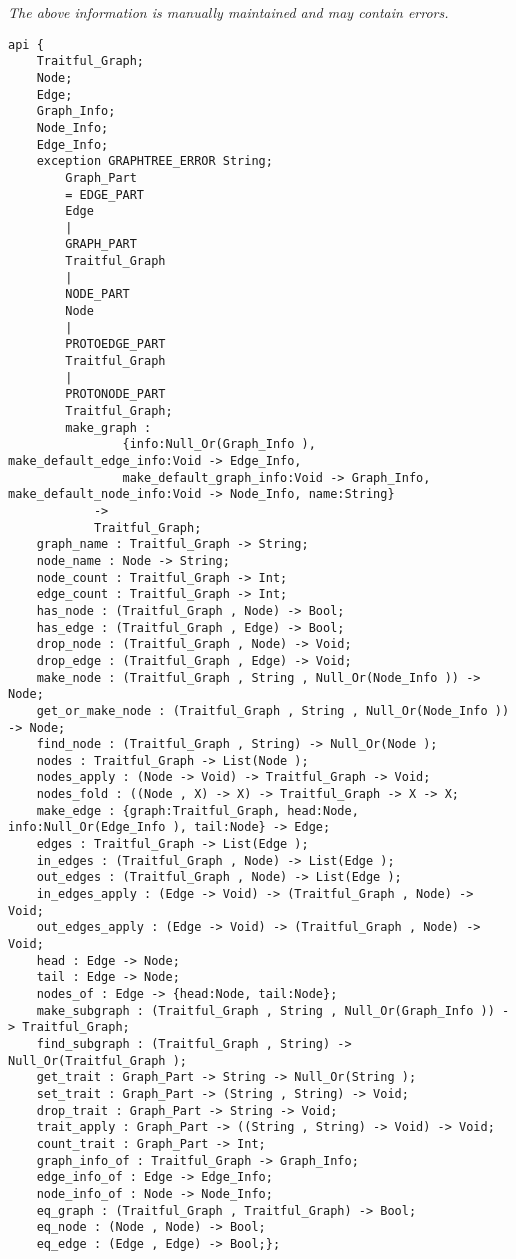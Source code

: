 \label{api:Traitful\_Graphtree}

{\tiny \it The above information is manually maintained and may contain errors.}
\begin{verbatim}
api {
    Traitful_Graph;
    Node;
    Edge;
    Graph_Info;
    Node_Info;
    Edge_Info;
    exception GRAPHTREE_ERROR String;
        Graph_Part
        = EDGE_PART
        Edge
        |
        GRAPH_PART
        Traitful_Graph
        |
        NODE_PART
        Node
        |
        PROTOEDGE_PART
        Traitful_Graph
        |
        PROTONODE_PART
        Traitful_Graph;
        make_graph :
                {info:Null_Or(Graph_Info ), make_default_edge_info:Void -> Edge_Info,
                make_default_graph_info:Void -> Graph_Info, make_default_node_info:Void -> Node_Info, name:String}
            ->
            Traitful_Graph;
    graph_name : Traitful_Graph -> String;
    node_name : Node -> String;
    node_count : Traitful_Graph -> Int;
    edge_count : Traitful_Graph -> Int;
    has_node : (Traitful_Graph , Node) -> Bool;
    has_edge : (Traitful_Graph , Edge) -> Bool;
    drop_node : (Traitful_Graph , Node) -> Void;
    drop_edge : (Traitful_Graph , Edge) -> Void;
    make_node : (Traitful_Graph , String , Null_Or(Node_Info )) -> Node;
    get_or_make_node : (Traitful_Graph , String , Null_Or(Node_Info )) -> Node;
    find_node : (Traitful_Graph , String) -> Null_Or(Node );
    nodes : Traitful_Graph -> List(Node );
    nodes_apply : (Node -> Void) -> Traitful_Graph -> Void;
    nodes_fold : ((Node , X) -> X) -> Traitful_Graph -> X -> X;
    make_edge : {graph:Traitful_Graph, head:Node, info:Null_Or(Edge_Info ), tail:Node} -> Edge;
    edges : Traitful_Graph -> List(Edge );
    in_edges : (Traitful_Graph , Node) -> List(Edge );
    out_edges : (Traitful_Graph , Node) -> List(Edge );
    in_edges_apply : (Edge -> Void) -> (Traitful_Graph , Node) -> Void;
    out_edges_apply : (Edge -> Void) -> (Traitful_Graph , Node) -> Void;
    head : Edge -> Node;
    tail : Edge -> Node;
    nodes_of : Edge -> {head:Node, tail:Node};
    make_subgraph : (Traitful_Graph , String , Null_Or(Graph_Info )) -> Traitful_Graph;
    find_subgraph : (Traitful_Graph , String) -> Null_Or(Traitful_Graph );
    get_trait : Graph_Part -> String -> Null_Or(String );
    set_trait : Graph_Part -> (String , String) -> Void;
    drop_trait : Graph_Part -> String -> Void;
    trait_apply : Graph_Part -> ((String , String) -> Void) -> Void;
    count_trait : Graph_Part -> Int;
    graph_info_of : Traitful_Graph -> Graph_Info;
    edge_info_of : Edge -> Edge_Info;
    node_info_of : Node -> Node_Info;
    eq_graph : (Traitful_Graph , Traitful_Graph) -> Bool;
    eq_node : (Node , Node) -> Bool;
    eq_edge : (Edge , Edge) -> Bool;};
\end{verbatim}
